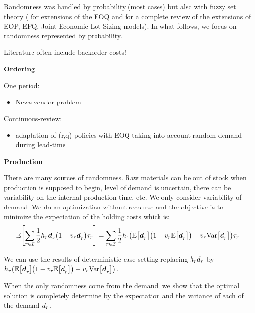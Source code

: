 Randomness was handled by probability (most cases) but also with fuzzy set theory (\eg \cite{Park1987,Lee1999,Wang2007} for extensions of the EOQ and \cite{Ziukov2015} for a complete review of the extensions of EOP, EPQ, Joint Economic Lot Sizing models). In what follows, we focus on randomness represented by probability.

Literature often include backorder costs!

\medskip

\textbf{Ordering}

One period:
\begin{itemize}
  \item News-vendor problem \cite{Edgeworth88,Arrow1951}
\end{itemize}

Continuous-review:
\begin{itemize}
  \item adaptation of (r,q) policies with EOQ taking into account random demand during lead-time \cite{Gallego1998}
\end{itemize}

\medskip

\textbf{Production}





There are many sources of randomness. Raw materials can be out of stock when production is supposed to begin, level of demand is uncertain, there can be variability on the internal production time, etc. We only consider variability of demand. We do an optimization without recourse and the objective is to minimize the expectation of the holding costs which is:
\begin{equation}
  \espe\sqbracket{\sum_{r\in\REF} \frac{1}{2}\holding_r\va\demand_r\bracket{1-\internal_r\va\demand_r}\cover_r}
  = 
  \sum_{r\in\REF} \frac{1}{2}\holding_r\bracket{\espe\sqbracket{\va\demand_r}\bracket{1-\internal_r\espe\sqbracket{\va\demand_r}}-\internal_r\vari\sqbracket{\va\demand_r}}\cover_r
\end{equation}

We can use the results of deterministic case setting replacing $h_rd_r$ by $\holding_r\bracket{\espe\sqbracket{\va\demand_r}\bracket{1-\internal_r\espe\sqbracket{\va\demand_r}}-\internal_r\vari\sqbracket{\va\demand_r}}$.


When the only randomness come from the demand, we show that the optimal solution is completely determine by the expectation and the variance of each of the demand $d_r$.


